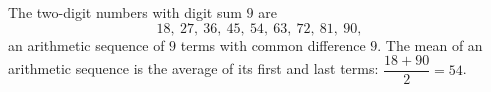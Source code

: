 The two-digit numbers with digit sum $9$ are
\[18,\ 27,\ 36,\ 45,\ 54,\ 63,\ 72,\ 81,\ 90,\]
an arithmetic sequence of $9$ terms with common difference $9$. The mean of an arithmetic sequence is the average of its first and last terms: $\dfrac{18+90}{2}=\boxed{54}$.
